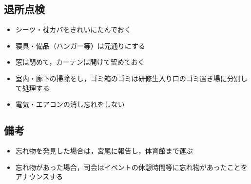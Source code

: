 \subsection{退所点検}
\begin{itemize}
\item シーツ・枕カバをきれいにたんでおく
\item 寝具・備品（ハンガー等）は元通りにする
\item 窓は閉めて，カーテンは開けて留めておく
\item 室内・廊下の掃除をし，ゴミ箱のゴミは研修生入り口のゴミ置き場に分別して処理する
\item 電気・エアコンの消し忘れをしない
\end{itemize}


\subsection{備考}
\begin{itemize}
  \item 忘れ物を発見した場合は，宮尾に報告し，体育館まで運ぶ
  \item 忘れ物があった場合，司会はイベントの休憩時間等に忘れ物があったことをアナウンスする
\end{itemize}

%


